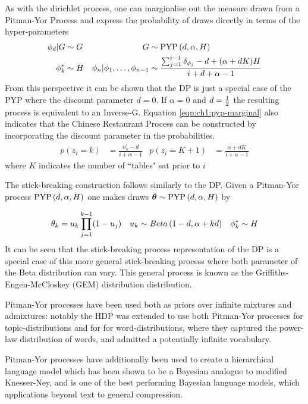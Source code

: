 As with the dirichlet process, one can marginalise out the measure drawn from a Pitman-Yor Process and express the probability of draws directly in terms of the hyper-parameters
\begin{align}
\phi_d|G & \sim G &
G & \sim \text{PYP} \left( {d, \alpha, H} \right) \\
\phi^*_k &\sim H &
\phi_n | \phi_1, \ldots, \phi_{n-1} & \sim 
    \frac{\sum_{j=1}^{i-1} \delta_{\phi_j} - d + (\alpha + dK) H}{i + d + \alpha - 1} \label{eqn:ch1:pyp-marginal}
\end{align}
From this perspective it can be shown that the DP is just a special case of the PYP where the discount parameter $d=0$. If $\alpha = 0$ and $d=\frac{1}{2}$ the resulting process is equivalent to an Inverse-G. Equation \eqref{eqn:ch1:pyp-marginal} also indicates that the Chinese Restaurant Process can be constructed by incorporating the discount parameter in the probabilities.
\begin{align}
p(z_i = k) & = \frac{n^i_k - d}{i + \alpha - 1} &
p(z_i = K + 1) & = \frac{\alpha + dK}{i + \alpha - 1}
\end{align}
where $K$ indicates the number of ``tables" sat prior to $i$


The stick-breaking construction follows similarly to the DP. Given a Pitman-Yor process $\text{PYP} \left( {d, \alpha, H} \right)$ one makes draws $\bm \theta \sim \text{PYP} \left( {d, \alpha, H} \right)$ by

\begin{align}
\theta_k & = u_k \prod_{j=1}^{k-1} (1 - u_j) &
u_k & \sim Beta \left( {1-d}, {\alpha + kd} \right) &
\phi^*_k \sim H
\end{align}
It can be seen that the stick-breaking process representation of the DP is a special case of this more general stick-breaking process where both parameter of the Beta distribution can vary. This general process is known as the Griffiths-Engen-McCloskey (GEM) distribution distribution\cite{Pitman2002}.

Pitman-Yor processes have been used both as priors over infinite mixtures and admixtures: notably the HDP was extended to use both Pitman-Yor processes for topic-distributions and for for word-distributions\cite{Buntine2014}, where they captured the power-law distribution of words, and admitted a potentially infinite vocabulary.

Pitman-Yor processes have additionally been used to create a hierarchical language model which has been shown to be a Bayesian analogue to modified Knesser-Ney\cite{Teh2002}, and is one of the best performing Bayesian language models, which applications beyond text to general compression\cite{Wood2011}. 


